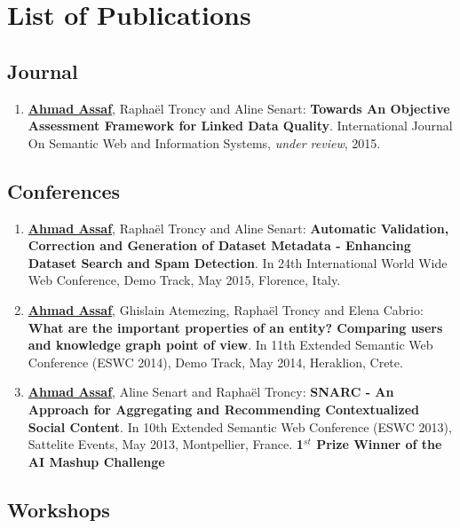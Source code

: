 \chapter*{List of Publications}

\section*{Journal}\label{sec:journals}

\begin{enumerate}
 \item \underline{\textbf{Ahmad Assaf}}, {R}apha{\"e}l {T}roncy and {A}line {S}enart: \textbf{Towards An Objective Assessment Framework for Linked Data Quality}. International Journal On Semantic Web and Information Systems, \emph{under review}, 2015.
\end{enumerate}

\section*{Conferences}\label{sec:conferences}

\begin{enumerate}
\item \underline{\textbf{Ahmad Assaf}}, {R}apha{\"e}l {T}roncy and {A}line {S}enart: \textbf{{A}utomatic Validation, Correction and Generation of Dataset Metadata - {E}nhancing Dataset Search and Spam Detection}. In 24th {I}nternational {W}orld {W}ide {W}eb {C}onference, Demo Track, May 2015, {F}lorence, {I}taly.
\item \underline{\textbf{Ahmad Assaf}}, {G}hislain {A}temezing, {R}apha{\"e}l {T}roncy and {E}lena {C}abrio: \textbf{{W}hat are the important properties of an entity? {C}omparing users and knowledge graph point of view}. In 11th {E}xtended {S}emantic {W}eb {C}onference (ESWC 2014), Demo Track, May 2014, {H}eraklion, {C}rete.
\item \underline{\textbf{Ahmad Assaf}}, {A}line {S}enart and {R}apha{\"e}l {T}roncy: \textbf{{SNARC} - An Approach for Aggregating and Recommending Contextualized Social Content}. In 10th {E}xtended {S}emantic {W}eb {C}onference (ESWC 2013), Sattelite Events, May 2013, {M}ontpellier, {F}rance. \textbf{1$^{st}$ Prize Winner of the AI Mashup Challenge}
\end{enumerate}

\section*{Workshops}\label{sec:workshops}


